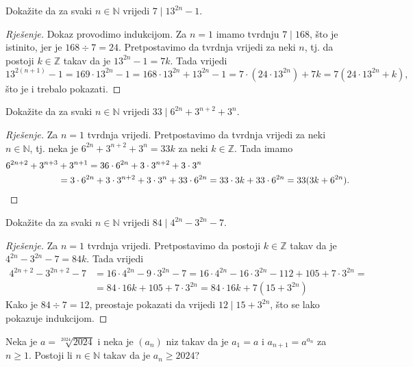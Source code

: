 \begin{exercise}
Dokažite da za svaki $n\in \mathbb{N}$ vrijedi $7 \; |\; 13^{2n}-1$.
\end{exercise}
\begin{proof}[Rješenje]
Dokaz provodimo indukcijom. Za $n=1$ imamo tvrdnju $7 \; |\; 168$, što je istinito, jer je $168 \div 7=24$. Pretpostavimo da tvrdnja vrijedi za neki $n$, tj. da postoji $k\in \mathbb{Z}$ takav da je $13^{2n}-1=7k$. Tada vrijedi
$$13^{2(n+1)}-1=169\cdot 13^{2n}-1=168\cdot 13^{2n}+13^{2n}-1=7\cdot (24\cdot 13^{2n})+7k=7(24\cdot 13^{2n}+k),$$
što je i trebalo pokazati.
\end{proof}
\begin{exercise}
Dokažite da za svaki $n\in \mathbb{N}$ vrijedi $33\; |\; 6^{2n}+3^{n+2}+3^n$.
\end{exercise}
\begin{proof}[Rješenje]
Za $n=1$ tvrdnja vrijedi. Pretpostavimo da tvrdnja vrijedi za neki $n\in \mathbb{N}$, tj. neka je $6^{2n}+3^{n+2}+3^n=33k$ za neki $k\in \mathbb{Z}$. Tada imamo
\begin{align*}
6^{2n+2}+3^{n+3}&+3^{n+1}=36\cdot 6^{2n}+3\cdot 3^{n+2}+3\cdot 3^n\\
&=3\cdot 6^{2n}+3\cdot 3^{n+2}+3\cdot 3^n+33\cdot 6^{2n}=33\cdot 3k+33\cdot 6^{2n}=33(3k+6^{2n}).\qedhere
\end{align*}
\end{proof}
\begin{exercise}
Dokažite da za svaki $n\in \mathbb{N}$ vrijedi $84\; |\; 4^{2n}-3^{2n}-7$.
\end{exercise}
\begin{proof}[Rješenje]
Za $n=1$ tvrdnja vrijedi. Pretpostavimo da postoji $k\in \mathbb{Z}$ takav da je $4^{2n}-3^{2n}-7=84k$. Tada vrijedi
\begin{align*}
4^{2n+2}-3^{2n+2}-7&=16\cdot 4^{2n}-9\cdot 3^{2n}-7=16\cdot 4^{2n}-16\cdot 3^{2n}-112+105+7\cdot 3^{2n}=\\
&=84\cdot 16k+105+7\cdot 3^{2n}=84\cdot 16k+7(15+3^{2n})
\end{align*}
Kako je $84\div 7=12$, preostaje pokazati da vrijedi $12 \; |\; 15+3^{2n}$, što se lako pokazuje indukcijom.
\end{proof}
\begin{exercise}
Neka je $a=\sqrt[2024]{2024}$ i neka je $(a_n)$ niz takav da je $a_1=a$ i $a_{n+1}=a^{a_n}$ za $n\geq 1$. Postoji li $n\in \mathbb{N}$ takav da je $a_n\geq 2024$?
\end{exercise}
